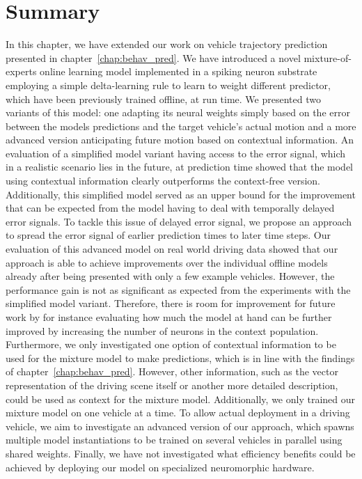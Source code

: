 \section{Summary}
\label{sec:online_learn_summ}

In this chapter, we have extended our work on vehicle trajectory prediction presented in chapter~\ref{chap:behav_pred}.
We have introduced a novel mixture-of-experts online learning model implemented in a spiking neuron substrate employing a simple delta-learning rule to learn to weight different predictor, which have been previously trained offline, at run time.
We presented two variants of this model: one adapting its neural weights simply based on the error between the models predictions and the target vehicle's actual motion and a more advanced version anticipating future motion based on contextual information.
An evaluation of a simplified model variant having access to the error signal, which in a realistic scenario lies in the future, at prediction time showed that the model using contextual information clearly outperforms the context-free version.
Additionally, this simplified model served as an upper bound for the improvement that can be expected from the model having to deal with temporally delayed error signals.
To tackle this issue of delayed error signal, we propose an approach to spread the error signal of earlier prediction times to later time steps.
Our evaluation of this advanced model on real world driving data showed that our approach is able to achieve improvements over the individual offline models already after being presented with only a few example vehicles.
However, the performance gain is not as significant as expected from the experiments with the simplified model variant.
Therefore, there is room for improvement for future work by for instance evaluating how much the model at hand can be further improved by increasing the number of neurons in the context population.
Furthermore, we only investigated one option of contextual information to be used for the mixture model to make predictions, which is in line with the findings of chapter~\ref{chap:behav_pred}.
However, other information, such as the vector representation of the driving scene itself or another more detailed description, could be used as context for the mixture model.
Additionally, we only trained our mixture model on one vehicle at a time.
To allow actual deployment in a driving vehicle, we aim to investigate an advanced version of our approach, which spawns multiple model instantiations to be trained on several vehicles in parallel using shared weights.
Finally, we have not investigated what efficiency benefits could be achieved by deploying our model on specialized neuromorphic hardware.
